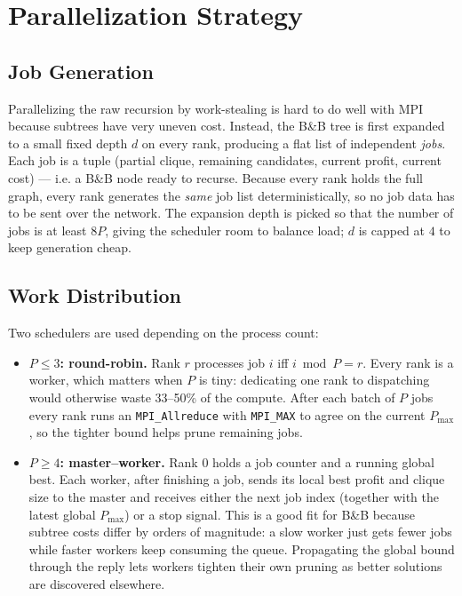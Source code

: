 \documentclass[11pt]{article}
\begin{document}
\section{Parallelization Strategy}

\subsection{Job Generation}
Parallelizing the raw recursion by work-stealing is hard to do well with MPI because subtrees have very uneven cost. Instead, the B\&B tree is first expanded to a small fixed depth $d$ on every rank, producing a flat list of independent \emph{jobs}. Each job is a tuple (partial clique, remaining candidates, current profit, current cost) --- i.e. a B\&B node ready to recurse. Because every rank holds the full graph, every rank generates the \emph{same} job list deterministically, so no job data has to be sent over the network. The expansion depth is picked so that the number of jobs is at least $8P$, giving the scheduler room to balance load; $d$ is capped at $4$ to keep generation cheap.

\subsection{Work Distribution}
Two schedulers are used depending on the process count:

\begin{itemize}
    \item \textbf{$P \leq 3$: round-robin.} Rank $r$ processes job $i$ iff $i \bmod P = r$. Every rank is a worker, which matters when $P$ is tiny: dedicating one rank to dispatching would otherwise waste 33--50\% of the compute. After each batch of $P$ jobs every rank runs an \texttt{MPI\_Allreduce} with \texttt{MPI\_MAX} to agree on the current $P_{\max}$, so the tighter bound helps prune remaining jobs.
    \item \textbf{$P \geq 4$: master--worker.} Rank 0 holds a job counter and a running global best. Each worker, after finishing a job, sends its local best profit and clique size to the master and receives either the next job index (together with the latest global $P_{\max}$) or a stop signal. This is a good fit for B\&B because subtree costs differ by orders of magnitude: a slow worker just gets fewer jobs while faster workers keep consuming the queue. Propagating the global bound through the reply lets workers tighten their own pruning as better solutions are discovered elsewhere.
\end{itemize}
\end{document}
